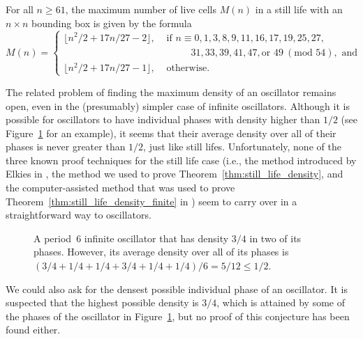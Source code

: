 \begin{theorem}\label{thm:still_life_density_finite}
	For all $n \geq 61$, the maximum number of live cells $M(n)$ in a still life with an $n \times n$ bounding box is given by the formula
	$$
	M(n) = \begin{cases}
	\lfloor n^2/2 + 17n/27 - 2 \rfloor, & \text{ if } n \equiv 0, 1, 3, 8, 9, 11, 16, 17, 19, 25, 27, \\
	& \quad \quad \ \ \ \, 31, 33, 39, 41, 47, \text{or } 49 \ (\text{mod } 54) , \text{ and} \\
	\lfloor n^2/2 + 17n/27 - 1 \rfloor, & \text{ otherwise}.
	\end{cases}
	$$
\end{theorem}

The related problem of finding the maximum density of an oscillator remains open, even in the (presumably) simpler case of infinite oscillators. Although it is possible for oscillators to have individual phases with density higher than $1/2$ (see Figure~\ref{fig:dense_oscillator} for an example), it seems that their average density over all of their phases is never greater than $1/2$, just like still lifes. Unfortunately, none of the three known proof techniques for the still life case (i.e., the method introduced by Elkies in \cite{Elk98}, the method we used to prove Theorem~\ref{thm:still_life_density}, and the computer-assisted method that was used to prove Theorem~\ref{thm:still_life_density_finite} in \cite{CS12}) seem to carry over in a straightforward way to oscillators.

\begin{figure}[!htb]
	\centering
	\caption{A period~$6$ infinite oscillator that has density $3/4$ in two of its phases. However, its average density over all of its phases is $(3/4 + 1/4 + 1/4 + 3/4 + 1/4 + 1/4)/6 = 5/12 \leq 1/2$.}\label{fig:dense_oscillator}
\end{figure}

We could also ask for the densest possible individual phase of an oscillator. It is suspected that the highest possible density is $3/4$, which is attained by some of the phases of the oscillator in Figure~\ref{fig:dense_oscillator}, but no proof of this conjecture has been found either.


